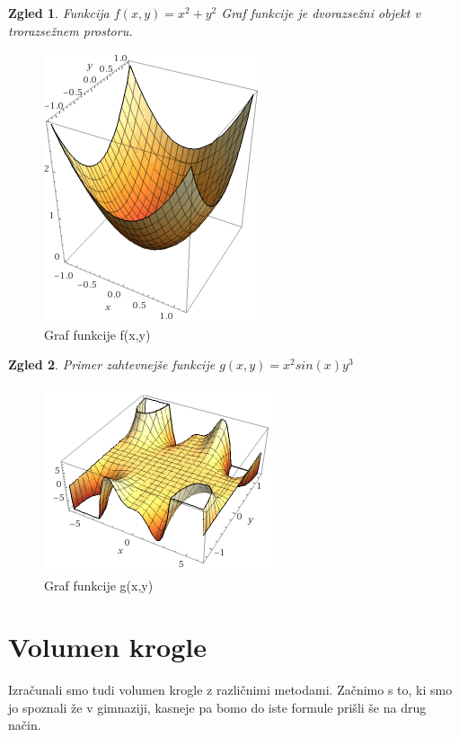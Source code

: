 \documentclass[12pt, a4paper]{article}
\newtheorem{zgled}{Zgled}
\begin{document}
\begin{zgled}
Funkcija $f(x,y)=x^2+y^2$ Graf funkcije je dvorazsežni objekt v trorazsežnem prostoru.
\end{zgled}

\begin{figure}[h!]
\centering
\includegraphics{slika_funkcije.PNG}
\caption{Graf funkcije f(x,y)}
\end{figure}

\newpage
\begin{zgled}
Primer zahtevnejše funkcije $g(x,y)=x^2 sin(x)y^3$ 
\end{zgled}

\begin{figure}[h!]
\centering
\includegraphics{funkcija_2.PNG}
\caption{Graf funkcije g(x,y)}
\end{figure}

\section{Volumen krogle}

Izračunali smo tudi volumen krogle z različnimi metodami. Začnimo s to, ki smo jo spoznali že v gimnaziji, kasneje pa bomo do iste formule prišli še na drug način. 
\end{document}
